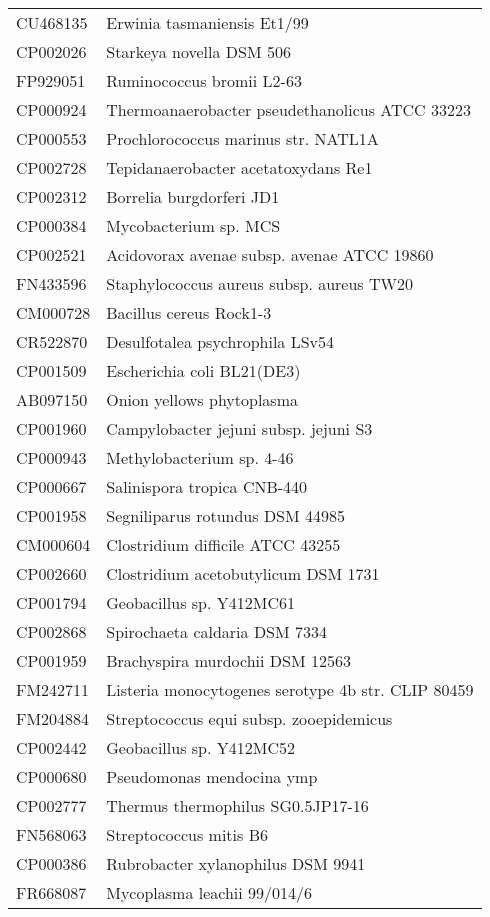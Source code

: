 \begin{longtable}{ll}
CU468135 & Erwinia tasmaniensis Et1/99\\
CP002026 & Starkeya novella DSM 506\\
FP929051 & Ruminococcus bromii L2-63\\
CP000924 & Thermoanaerobacter pseudethanolicus ATCC 33223\\
CP000553 & Prochlorococcus marinus str. NATL1A\\
CP002728 & Tepidanaerobacter acetatoxydans Re1\\
CP002312 & Borrelia burgdorferi JD1\\
CP000384 & Mycobacterium sp. MCS\\
CP002521 & Acidovorax avenae subsp. avenae ATCC 19860\\
FN433596 & Staphylococcus aureus subsp. aureus TW20\\
CM000728 & Bacillus cereus Rock1-3\\
CR522870 & Desulfotalea psychrophila LSv54\\
CP001509 & Escherichia coli BL21(DE3)\\
AB097150 & Onion yellows phytoplasma\\
CP001960 & Campylobacter jejuni subsp. jejuni S3\\
CP000943 & Methylobacterium sp. 4-46\\
CP000667 & Salinispora tropica CNB-440\\
CP001958 & Segniliparus rotundus DSM 44985\\
CM000604 & Clostridium difficile ATCC 43255\\
CP002660 & Clostridium acetobutylicum DSM 1731\\
CP001794 & Geobacillus sp. Y412MC61\\
CP002868 & Spirochaeta caldaria DSM 7334\\
CP001959 & Brachyspira murdochii DSM 12563\\
FM242711 & Listeria monocytogenes serotype 4b str. CLIP 80459\\
FM204884 & Streptococcus equi subsp. zooepidemicus\\
CP002442 & Geobacillus sp. Y412MC52\\
CP000680 & Pseudomonas mendocina ymp\\
CP002777 & Thermus thermophilus SG0.5JP17-16\\
FN568063 & Streptococcus mitis B6\\
CP000386 & Rubrobacter xylanophilus DSM 9941\\
FR668087 & Mycoplasma leachii 99/014/6\\

\end{longtable}
